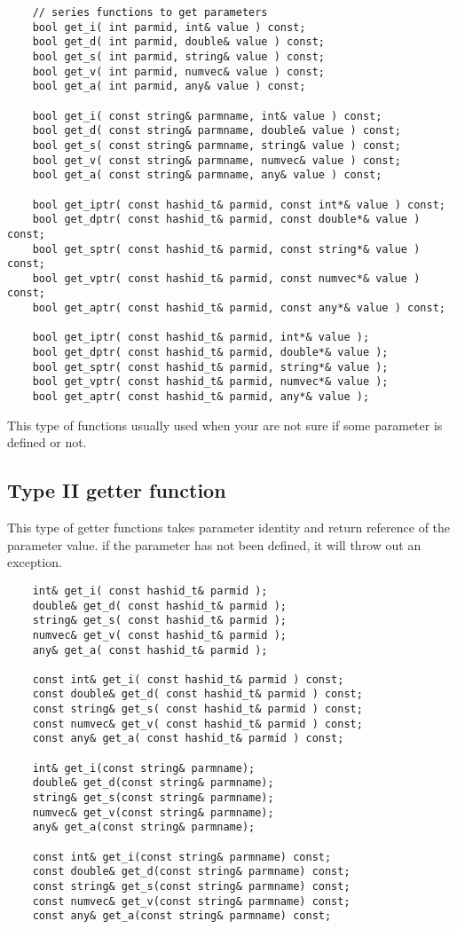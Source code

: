 \documentclass[letterpaper]{book}
\begin{document}
\begin{lstlisting}
    // series functions to get parameters
    bool get_i( int parmid, int& value ) const; 
    bool get_d( int parmid, double& value ) const;
    bool get_s( int parmid, string& value ) const;
    bool get_v( int parmid, numvec& value ) const;
    bool get_a( int parmid, any& value ) const; 

    bool get_i( const string& parmname, int& value ) const;
    bool get_d( const string& parmname, double& value ) const;
    bool get_s( const string& parmname, string& value ) const;
    bool get_v( const string& parmname, numvec& value ) const;
    bool get_a( const string& parmname, any& value ) const; 

    bool get_iptr( const hashid_t& parmid, const int*& value ) const; 
    bool get_dptr( const hashid_t& parmid, const double*& value ) const;
    bool get_sptr( const hashid_t& parmid, const string*& value ) const;
    bool get_vptr( const hashid_t& parmid, const numvec*& value ) const;
    bool get_aptr( const hashid_t& parmid, const any*& value ) const; 

    bool get_iptr( const hashid_t& parmid, int*& value );
    bool get_dptr( const hashid_t& parmid, double*& value );
    bool get_sptr( const hashid_t& parmid, string*& value );
    bool get_vptr( const hashid_t& parmid, numvec*& value );
    bool get_aptr( const hashid_t& parmid, any*& value ); 
\end{lstlisting}
  This type of functions usually used when your are not sure if some parameter is defined or not.

\subsection{Type II getter function}
  This type of getter functions takes parameter identity and return reference of the parameter value.
if the parameter has not been defined, it will throw out an exception.
  
\begin{lstlisting}
    int& get_i( const hashid_t& parmid ); 
    double& get_d( const hashid_t& parmid ); 
    string& get_s( const hashid_t& parmid ); 
    numvec& get_v( const hashid_t& parmid ); 
    any& get_a( const hashid_t& parmid ); 

    const int& get_i( const hashid_t& parmid ) const; 
    const double& get_d( const hashid_t& parmid ) const;
    const string& get_s( const hashid_t& parmid ) const;
    const numvec& get_v( const hashid_t& parmid ) const;
    const any& get_a( const hashid_t& parmid ) const; 

    int& get_i(const string& parmname); 
    double& get_d(const string& parmname);
    string& get_s(const string& parmname);
    numvec& get_v(const string& parmname);
    any& get_a(const string& parmname); 

    const int& get_i(const string& parmname) const;
    const double& get_d(const string& parmname) const;
    const string& get_s(const string& parmname) const;
    const numvec& get_v(const string& parmname) const;
    const any& get_a(const string& parmname) const; 
\end{lstlisting}
\end{document}
